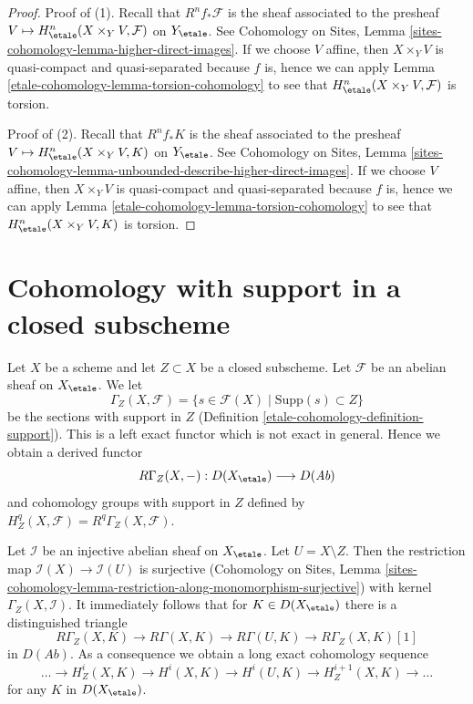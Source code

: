 \begin{proof}
Proof of (1). Recall that $R^nf_*\mathcal{F}$ is the sheaf associated
to the presheaf $V \mapsto H^n_\etale(X \times_Y V, \mathcal{F})$
on $Y_\etale$. See Cohomology on Sites,
Lemma \ref{sites-cohomology-lemma-higher-direct-images}.
If we choose $V$ affine, then $X \times_Y V$ is
quasi-compact and quasi-separated because $f$ is, hence
we can apply Lemma \ref{etale-cohomology-lemma-torsion-cohomology} to see that
$H^n_\etale(X \times_Y V, \mathcal{F})$ is torsion.

\medskip\noindent
Proof of (2). Recall that $R^nf_*K$ is the sheaf associated
to the presheaf $V \mapsto H^n_\etale(X \times_Y V, K)$
on $Y_\etale$. See Cohomology on Sites,
Lemma \ref{sites-cohomology-lemma-unbounded-describe-higher-direct-images}.
If we choose $V$ affine, then $X \times_Y V$ is
quasi-compact and quasi-separated because $f$ is, hence
we can apply Lemma \ref{etale-cohomology-lemma-torsion-cohomology} to see that
$H^n_\etale(X \times_Y V, K)$ is torsion.
\end{proof}

\section{Cohomology with support in a closed subscheme}
\label{etale-cohomology-section-cohomology-support}
Let $X$ be a scheme and let $Z \subset X$ be a closed subscheme.
Let $\mathcal{F}$ be an abelian sheaf on $X_\etale$. We let
$$
\Gamma_Z(X, \mathcal{F}) =
\{s \in \mathcal{F}(X) \mid \text{Supp}(s) \subset Z\}
$$
be the sections with support in $Z$ (Definition \ref{etale-cohomology-definition-support}).
This is a left exact functor which is not exact in general.
Hence we obtain a derived functor
$$
R\Gamma_Z(X, -) : D(X_\etale) \longrightarrow D(\textit{Ab})
$$
and cohomology groups with support in $Z$ defined by
$H^q_Z(X, \mathcal{F}) = R^q\Gamma_Z(X, \mathcal{F})$.

\medskip\noindent
Let $\mathcal{I}$ be an injective abelian sheaf on $X_\etale$.
Let $U = X \setminus Z$.
Then the restriction map $\mathcal{I}(X) \to \mathcal{I}(U)$ is surjective
(Cohomology on Sites, Lemma
\ref{sites-cohomology-lemma-restriction-along-monomorphism-surjective})
with kernel $\Gamma_Z(X, \mathcal{I})$. It immediately follows that
for $K \in D(X_\etale)$ there is a distinguished triangle
$$
R\Gamma_Z(X, K) \to R\Gamma(X, K) \to R\Gamma(U, K) \to R\Gamma_Z(X, K)[1]
$$
in $D(\textit{Ab})$. As a consequence we obtain a long exact cohomology
sequence
$$
\ldots \to H^i_Z(X, K) \to H^i(X, K) \to H^i(U, K) \to
H^{i + 1}_Z(X, K) \to \ldots
$$
for any $K$ in $D(X_\etale)$.

